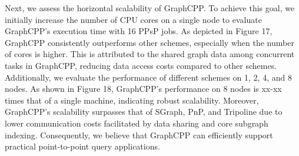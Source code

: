 \documentclass[lettersize,journal]{IEEEtran} %
\begin{document}
Next, we assess the horizontal scalability of GraphCPP. To achieve this goal, we initially increase the number of CPU cores on a single node to evaluate GraphCPP's execution time with 16 PPsP jobs. As depicted in Figure 17, GraphCPP consistently outperforms other schemes, especially when the number of cores is higher. This is attributed to the shared graph data among concurrent tasks in GraphCPP, reducing data access costs compared to other schemes. Additionally, we evaluate the performance of different schemes on 1, 2, 4, and 8 nodes. As shown in Figure 18, GraphCPP's performance on 8 nodes is xx-xx times that of a single machine, indicating robust scalability. Moreover, GraphCPP's scalability surpasses that of SGraph, PnP, and Tripoline due to lower communication costs facilitated by data sharing and core subgraph indexing. Consequently, we believe that GraphCPP can efficiently support practical point-to-point query applications.
\end{document}
